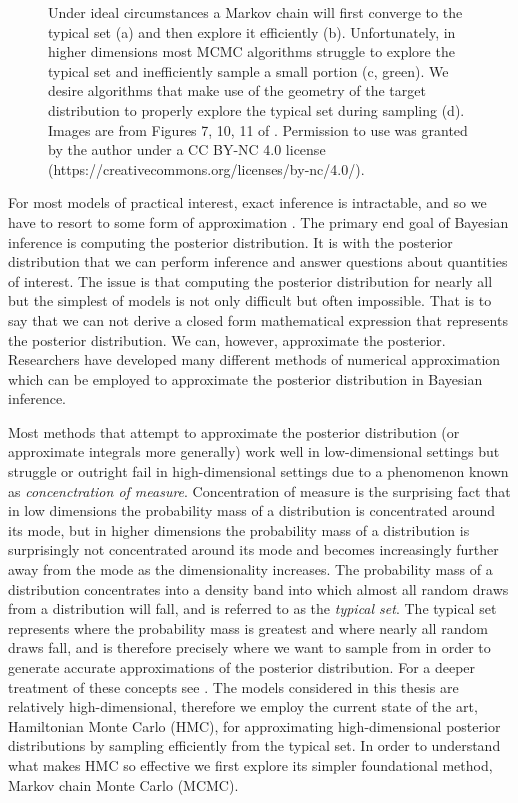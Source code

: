 \begin{figure}
	\caption{Under ideal circumstances a Markov chain will first converge to the typical set (a) and then explore it efficiently (b). Unfortunately, in higher dimensions most MCMC algorithms struggle to explore the typical set and inefficiently sample a small portion (c, green). We desire algorithms that make use of the geometry of the target distribution to properly explore the typical set during sampling (d). Images are from Figures 7, 10, 11 of \cite{Betancourt2017}. Permission to use was granted by the author under a CC BY-NC 4.0 license (https://creativecommons.org/licenses/by-nc/4.0/).}
	\label{fig:mcmc}
\end{figure}

For most models of practical interest, exact inference is intractable, and so we have to resort to some form of approximation \cite{Bishop2006}. The primary end goal of Bayesian inference is computing the posterior distribution. It is with the posterior distribution that we can perform inference and answer questions about quantities of interest. The issue is that computing the posterior distribution for nearly all but the simplest of models is not only difficult but often impossible. That is to say that we can not derive a closed form mathematical expression that represents the posterior distribution. We can, however, approximate the posterior. Researchers have developed many different methods of numerical approximation which can be employed to approximate the posterior distribution in Bayesian inference.

Most methods that attempt to approximate the posterior distribution (or approximate integrals more generally) work well in low-dimensional settings but struggle or outright fail in high-dimensional settings due to a phenomenon known as \textit{concenctration of measure}. Concentration of measure is the surprising fact that in low dimensions the probability mass of a distribution is concentrated around its mode, but in higher dimensions the probability mass of a distribution is surprisingly not concentrated around its mode and becomes increasingly further away from the mode as the dimensionality increases. The probability mass of a distribution concentrates into a density band into which almost all random draws from a distribution will fall, and is referred to as the \textit{typical set}. The typical set represents where the probability mass is greatest and where nearly all random draws fall, and is therefore precisely where we want to sample from in order to generate accurate approximations of the posterior distribution. For a deeper treatment of these concepts see \cite{Betancourt2017} \cite{Carpenter2017}. The models considered in this thesis are relatively high-dimensional, therefore we employ the current state of the art, Hamiltonian Monte Carlo (HMC), for approximating high-dimensional posterior distributions by sampling efficiently from the typical set. In order to understand what makes HMC so effective we first explore its simpler foundational method, Markov chain Monte Carlo (MCMC).

